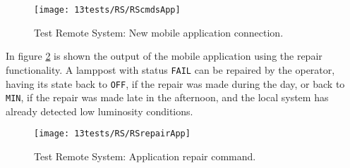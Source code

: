 \begin{figure}[H]
	\centering	
	\texttt{[image: 13tests/RS/RScmdsApp]}
	\caption{Test Remote System: New mobile application connection.}
	\label{fig:RScmdsApp}
\end{figure}

In figure \ref{fig:RSrepairApp} is shown the output of the mobile application using the repair functionality. A lamppost with status \verb|FAIL| can be repaired by the operator, having its state back to \verb|OFF|, if the repair was made during the day, or back to \verb|MIN|, if the repair was made late in the afternoon, and the local system has already detected low luminosity conditions.

\begin{figure}[H]
	\centering	
	\texttt{[image: 13tests/RS/RSrepairApp]}
	\caption{Test Remote System: Application repair command.}
	\label{fig:RSrepairApp}
\end{figure}
